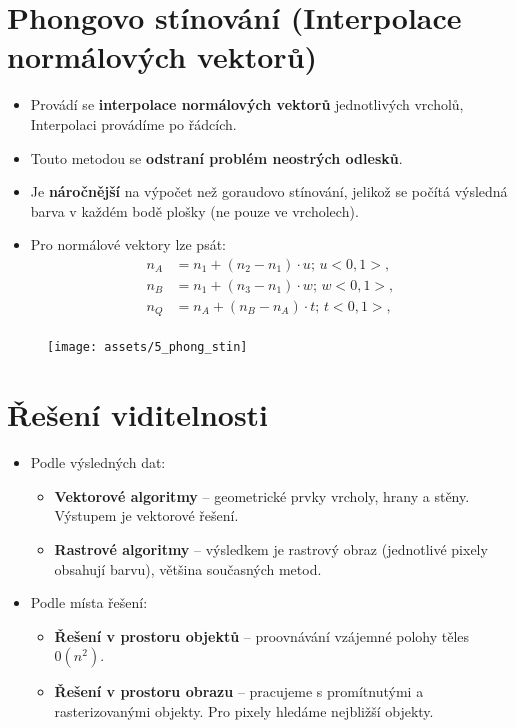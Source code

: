 \section{Phongovo stínování (Interpolace normálových vektorů)}
\begin{itemize}
    \item Provádí se \textbf{interpolace normálových vektorů} jednotlivých vrcholů, Interpolaci provádíme po řádcích.
    \item Touto metodou se \textbf{odstraní problém neostrých odlesků}.
    \item Je \textbf{náročnější} na výpočet než goraudovo stínování, jelikož se počítá výsledná barva v každém bodě plošky (ne pouze ve vrcholech).
    \item Pro normálové vektory lze psát:
          \begin{equation*}
              \begin{split}
                  n_A &= n_1 + (n_2 - n_1) \cdot u; \, u <0, 1>, \\
                  n_B &= n_1 + (n_3 - n_1) \cdot w; \, w <0, 1>, \\
                  n_Q &= n_A + (n_B - n_A) \cdot t; \, t <0, 1>, \\
              \end{split}
          \end{equation*}
\end{itemize}
\begin{figure}[H]
    \centering
    \texttt{[image: assets/5\_phong\_stin]}
\end{figure}
\section{Řešení viditelnosti}
\begin{itemize}
    \item Podle výsledných dat:
          \begin{itemize}
              \item \textbf{Vektorové algoritmy} -- geometrické prvky vrcholy, hrany a stěny. Výstupem je vektorové řešení.
              \item \textbf{Rastrové algoritmy} -- výsledkem je rastrový obraz (jednotlivé pixely obsahují barvu), většina současných metod.
          \end{itemize}
    \item Podle místa řešení:
          \begin{itemize}
              \item \textbf{Řešení v prostoru objektů} -- proovnávání vzájemné polohy těles $0(n^2)$.
              \item \textbf{Řešení v prostoru obrazu} -- pracujeme s promítnutými a rasterizovanými objekty. Pro pixely hledáme nejbližší objekty.
          \end{itemize}
\end{itemize}

